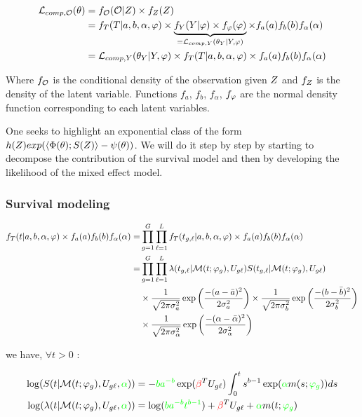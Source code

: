 \documentclass[a4paper]{article}
\begin{document}
\begin{myAppendix}
\newcommand{\df}[1]{f_{#1}(#1)}

\begin{align*}
    \Lcomp[,\varobs] ( \theta ) &= f_\varobs(\varobs | \varlat) \times f_{\varlat}(\varlat)
    \\ &= f_T(T | a,b,\alpha,\vphi) \times \ub{f_Y(Y| \vphi) \times  f_\vphi(\vphi)}_{=\Lcomp[,Y](\theta_Y | Y, \vphi)} 
    \times \df a \df b \df \alpha
    \\ &= \Lcomp[,Y](\theta_Y | Y,\vphi) \times f_T(T | a,b,\alpha,\vphi) 
    \times \df a \df b \df \alpha
\end{align*}

Where $f_\mathcal O$ is the conditional density of the observation given $Z$ and $f_{Z}$ is the density of the latent variable. Functions $f_a$, $f_b$, $f_\alpha$, $f_\varphi$ are the normal density function corresponding to each latent variables.


One seeks to highlight an exponential class of the form $h(Z)exp(\left\langle\Phi(\theta); S(Z)\right\rangle -\psi(\theta))$. We will do it step by step by starting to decompose the contribution of the survival model and then by developing the likelihood of the mixed effect model.


\subsubsection*{Survival modeling}
    
    \begin{align*}
        f_T(t | a,b,\alpha,\vphi) \times \df a \df b \df \alpha
        =& \pro \geno 1 \maxgeno \pro \lines 1 \maxlines f_T(t_\genolines | a,b,\alpha,\vphi) \times \df a \df b \df \alpha
        \\
        =& \pro \geno 1 \maxgeno \pro \lines 1 \maxlines \lambda(t_\genolines | \mc M( t ; \vphi_\geno),U_\meltgenolines) S(t_\genolines|\mc M( t ; \vphi_\geno),U_\meltgenolines) 
        \\ &\times \dnorm{\bar a}{\sigma_a^2}{a} \times \dnorm{\bar b}{\sigma_b^2}{b}
        \\ &\times  \dnorm{\bar \alpha}{\sigma_\alpha^2}{\alpha}
    \end{align*}
    
    we have, $\forall t > 0$ :
    
    \begin{align*}
        \log(S(t|\mathcal M( t ; \varphi_g), U_{g\ell}, \textcolor{green}{\alpha}))  &= -\textcolor{green}{b a^{-b}} \exp(\textcolor{red}{\beta}^T U_{g\ell}) \int_0^t s^{b-1} \exp(\textcolor{green}{\alpha} m(s; \textcolor{green}{\varphi_g})) ds
        \\ \log(\lambda(t | \mathcal M(t ; \varphi_g), U_{g\ell}, \textcolor{green}{\alpha})) &= \log(\textcolor{green}{b a^{-b} t^{b-1}}) + \textcolor{red}{\beta}^T U_{g\ell} + \textcolor{green}{\alpha}m(t ; \textcolor{green}{\varphi_g})
    \end{align*}


\end{myAppendix}
\end{document}
